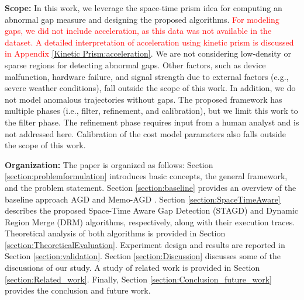 \documentclass[acmsmall]{acmart}
\begin{document}
\textbf{Scope:} In this work, we leverage the space-time prism idea for computing an abnormal gap measure and designing the proposed algorithms. \textcolor{red}{For modeling gaps, we did not include acceleration, as this data was not available in the dataset. A detailed interpretation of acceleration using kinetic prism is discussed in Appendix \ref{Kinetic Prism:acceleration}}. We are not considering low-density or sparse regions for detecting abnormal gaps. Other factors, such as device malfunction, hardware failure, and signal strength due to external factors (e.g., severe weather conditions), fall outside the scope of this work. In addition, we do not model anomalous trajectories without gaps. The proposed framework has multiple phases (i.e., filter, refinement, and calibration), but we limit this work to the filter phase. The refinement phase requires input from a human analyst and is not addressed here. Calibration of the cost model parameters also falls outside the scope of this work.

\textbf{Organization:} The paper is organized as follows: Section \ref{section:problemformulation} introduces basic concepts, the general framework, and the problem statement. Section \ref{section:baseline} provides an overview of the baseline approach AGD and Memo-AGD \cite{sharma2022abnormal}. Section \ref{section:SpaceTimeAware} describes the proposed Space-Time Aware Gap Detection (STAGD) and Dynamic Region Merge (DRM) algorithms, respectively, along with their execution traces. Theoretical analysis of both algorithms is provided in Section \ref{section:TheoreticalEvaluation}. Experiment design and results are reported in Section \ref{section:validation}. Section \ref{section:Discussion} discusses some of the discussions of our study. A study of related work is provided in Section \ref{section:Related_work}. Finally, Section \ref{section:Conclusion_future_work} provides the conclusion and future work.\\
\end{document}
